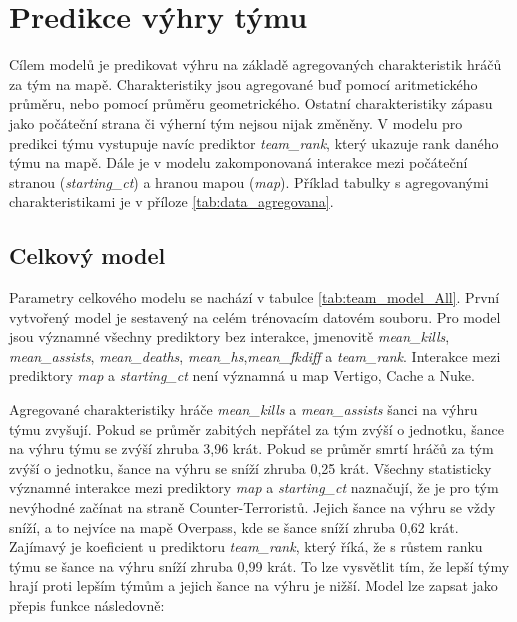 
\section{Predikce výhry týmu}
Cílem modelů je predikovat výhru na základě agregovaných charakteristik hráčů za tým na mapě. Charakteristiky jsou agregované buď pomocí aritmetického průměru,
nebo pomocí průměru geometrického. Ostatní charakteristiky zápasu jako počáteční strana či výherní tým nejsou nijak změněny. V modelu pro predikci týmu vystupuje
navíc prediktor \textit{team\_rank}, který ukazuje rank daného týmu na mapě. Dále je v modelu zakomponovaná interakce
mezi počáteční stranou (\textit{starting\_ct}) a hranou mapou (\textit{map}). Příklad tabulky s agregovanými charakteristikami je v příloze \ref{tab:data_agregovana}.

\subsection{Celkový model}



Parametry celkového modelu se nachází v tabulce \ref{tab:team_model_All}. První vytvořený model je sestavený na celém trénovacím datovém souboru. Pro model jsou
významné všechny prediktory bez interakce, jmenovitě \textit{mean\_kills}, \textit{mean\_assists}, \textit{mean\_deaths}, \textit{mean\_hs},\textit{mean\_fkdiff} a
\textit{team\_rank}. Interakce mezi prediktory \textit{map} a \textit{starting\_ct} není významná u map Vertigo, Cache a Nuke.

Agregované charakteristiky hráče \textit{mean\_kills} a \textit{mean\_assists} šanci na výhru týmu zvyšují. Pokud se průměr zabitých nepřátel za tým zvýší o jednotku,
šance na výhru týmu se zvýší zhruba 3,96 krát. Pokud se průměr smrtí hráčů za tým zvýší o jednotku, šance na výhru se sníží zhruba 0,25 krát. Všechny statisticky
významné interakce mezi prediktory \textit{map} a \textit{starting\_ct} naznačují, že je pro tým nevýhodné začínat na straně Counter-Terroristů. Jejich šance
na výhru se vždy sníží, a to nejvíce na mapě Overpass, kde se šance sníží zhruba 0,62 krát. Zajímavý je koeficient u prediktoru \textit{team\_rank}, který říká,
že s růstem ranku týmu se šance na výhru sníží zhruba 0,99 krát. To lze vysvětlit tím, že lepší týmy hrají proti lepším týmům a jejich 
šance na výhru je nižší. Model lze zapsat jako přepis funkce následovně:

